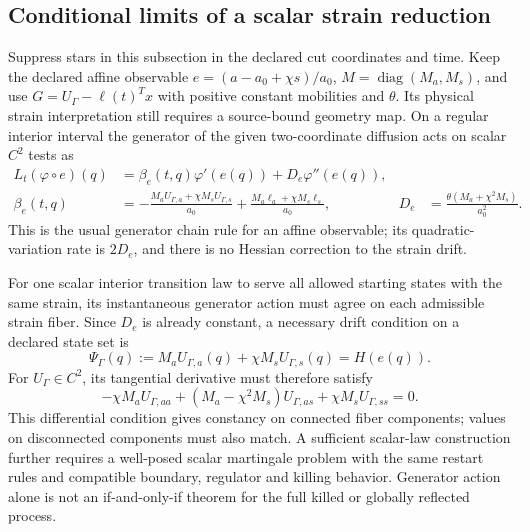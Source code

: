 \documentclass[11pt]{article}
\begin{document}
\subsection{Conditional limits of a scalar strain reduction}
Suppress stars in this subsection in the declared cut coordinates and time.
Keep the declared affine observable $e=(a-a_0+\chi s)/a_0$,
$M=\operatorname{diag}(M_a,M_s)$, and use $G=U_\Gamma-\ell(t)^Tx$
with positive constant mobilities and $\theta$. Its physical strain
interpretation still requires a source-bound geometry map. On a regular interior interval the generator
of the given two-coordinate diffusion acts on scalar $C^2$ tests as
\begin{align}
 L_t(\varphi\circ e)(q)&=\beta_e(t,q)\varphi'(e(q))
                  +D_e\varphi''(e(q)),\nonumber\\
 \beta_e(t,q)&=-\frac{M_aU_{\Gamma,a}+\chi M_sU_{\Gamma,s}}{a_0}
              +\frac{M_a\ell_a+\chi M_s\ell_s}{a_0},&
 D_e&=\frac{\theta(M_a+\chi^2M_s)}{a_0^2}.
 \label{eq:r09-strain-generator}
\end{align}
This is the usual generator chain rule for an affine observable; its
quadratic-variation rate is $2D_e$, and there is no Hessian correction to
the strain drift.

For one scalar interior transition law to serve all allowed starting states
with the same strain, its instantaneous generator action must agree on each
admissible strain fiber. Since $D_e$ is already constant, a necessary drift
condition on a declared state set is
\begin{equation}
 \Psi_\Gamma(q):=M_aU_{\Gamma,a}(q)+\chi M_sU_{\Gamma,s}(q)=H(e(q)).
 \label{eq:r09-fiber-closure}
\end{equation}
For $U_\Gamma\in C^2$, its tangential derivative must therefore satisfy
\begin{equation}
 -\chi M_a U_{\Gamma,aa}+(M_a-\chi^2M_s)U_{\Gamma,as}+\chi M_sU_{\Gamma,ss}=0.
 \label{eq:r09-fiber-tangent}
\end{equation}
This differential condition gives constancy on connected fiber components;
values on disconnected components must also match. A sufficient scalar-law
construction further requires a well-posed scalar martingale problem with
the same restart rules and compatible boundary, regulator and killing
behavior. Generator action alone is not an if-and-only-if theorem for the
full killed or globally reflected process.
\end{document}

